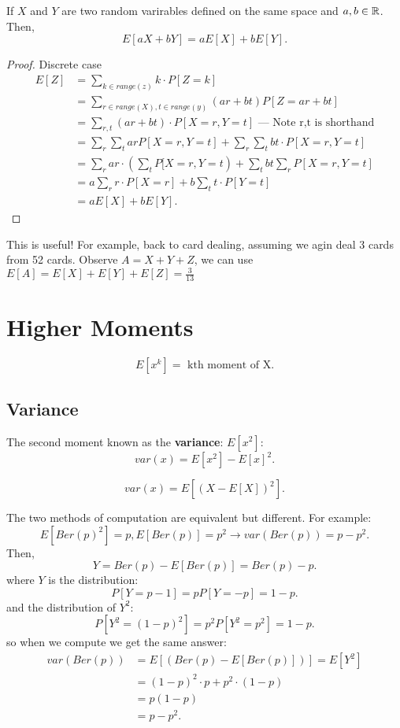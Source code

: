 \documentclass[a4paper]{article}
\begin{document}
\begin{theorem}
  If $X$ and $Y$ are two random varirables defined on the same space and $a,b \in \mathbb{R}$. Then,
  \[
    E[aX + bY] = aE[X] + b E[Y]
  .\] 
\end{theorem}
\begin{proof}{Discrete case}\\
  \begin{align*}
    E[Z] &= \sum_{k \in range(z)} k \cdot P[Z=k] \\
         &= \sum_{r \in range(X), t \in range(y)} (ar + bt)P[Z = ar + bt] \\ 
         &= \sum_{r,t} (ar + bt) \cdot P[X=r, Y=t] \text{ ---  Note r,t is shorthand} \\ 
         &= \sum_r \sum_t ar P[X=r, Y=t] + \sum_r \sum_t bt \cdot P[X=r, Y=t] \\
         &= \sum_r ar \cdot (\sum_t P[X=r, Y=t) + \sum_t bt \sum_r P[X=r,Y=t] \\
         &= a \sum_r r \cdot P[X=r] + b \sum_t t \cdot P[Y=t] \\
         &= a E[X] + b E[Y]
  .\end{align*}
\end{proof}

This is useful! For example, back to card dealing, assuming we agin deal 3 cards from 52 cards. Observe
$A = X + Y + Z$, we can use $E[A] = E[X] + E[Y] + E[Z] = \frac{3}{13}$

\section{Higher Moments}
\[
  E[x^k] = \text{ kth moment of X}
.\] 
\subsection{Variance}
\begin{definition}
  The second moment known as the \textbf{variance}: $E[x^2]$:
   \[
     var\left( x \right) = E[x^2] - E[x]^2 
  .\] 
\end{definition}

\begin{lemma}
  \[
    var\left( x \right) = E[(X - E[X])^2] 
  .\] 
\end{lemma}

\begin{remark}
  The two methods of computation are equivalent but different. For example:
  \[
    E[Ber(p)^2] = p, E[Ber(p)]= p^2 \to var(Ber(p)) = p - p^2
  .\] 
  Then, 
  \[
   Y = Ber(p) - E[Ber(p)] = Ber(p) - p
  .\] 
  where $Y$ is the distribution:
  \[
    P[Y=p-1] = p
    P[Y=-p] = 1-p
  .\] 
  and the distribution of $Y^2$:
  \[
    P[Y^2 = (1-p)^2] = p^2 
    P[Y^2 = p^2] = 1-p
  .\] 
  so when we compute we get the same answer:
  \begin{align*}
    var(Ber(p)) &= E[(Ber(p) - E[Ber(p)])] = E[Y^2] \\
                &= (1-p)^2 \cdot p + p^2 \cdot (1-p) \\
                &= p (1-p) \\
                &= p - p^2
  .\end{align*}
\end{remark}
\end{document}
